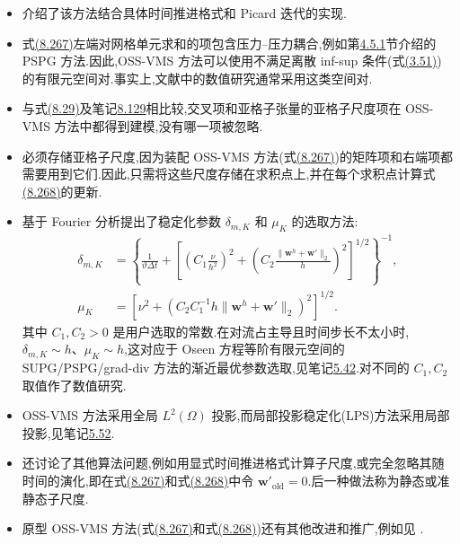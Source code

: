 \begin{note}
\label{note:vms-oss-properties}
\begin{itemize}
 \item \textcite{Codina2002}介绍了该方法结合具体时间推进格式和 Picard 迭代的实现.
 \item 式\hyperref[eq:vms-oss-resolved-scale-method]{(8.267)}左端对网格单元求和的项包含压力--压力耦合,例如第\hyperref[sec:stokes-pspg]{4.5.1}节介绍的 PSPG 方法.因此,OSS-VMS 方法可以使用不满足离散 inf-sup 条件(式\hyperref[eq:discrete-infsup-condition]{(3.51)})的有限元空间对.事实上,文献中的数值研究通常采用这类空间对.
 \item 与式\hyperref[eq:subgrid-stress-decomposition]{(8.29)}及笔记\hyperref[note:les-model-basic-approach]{8.129}相比较,交叉项和亚格子张量的亚格子尺度项在 OSS-VMS 方法中都得到建模,没有哪一项被忽略.
 \item 必须存储亚格子尺度,因为装配 OSS-VMS 方法(式\hyperref[eq:vms-oss-resolved-scale-method]{(8.267)})的矩阵项和右端项都需要用到它们.因此,只需将这些尺度存储在求积点上,并在每个求积点计算式\hyperref[eq:vms-oss-subscale-update]{(8.268)}的更新.
 \item \textcite{Codina2002}基于 Fourier 分析提出了稳定化参数 $\delta_{m,K}$ 和 $\mu_K$ 的选取方法:
 \[
 \begin{aligned}
 \delta_{m,K}&=\left\{\frac1{\vartheta\Delta t}
   +\left[\left(C_1\frac{\nu}{h^2}\right)^2
       +\left(C_2\frac{\|\bm w^h+\bm w'\|_2}{h}\right)^2\right]^{1/2}\right\}^{-1},\\
 \mu_K&=\left[\nu^2+
   \left(C_2 C_1^{-1}h\|\bm w^h+\bm w'\|_2\right)^2\right]^{1/2}.
 \end{aligned}
 \]
 其中 $C_1,C_2>0$ 是用户选取的常数.在对流占主导且时间步长不太小时,$\delta_{m,K}\sim h$、$\mu_K\sim h$,这对应于 Oseen 方程等阶有限元空间的 SUPG/PSPG/grad-div 方法的渐近最优参数选取,见笔记\hyperref[note:oseen-optimal-stabilization]{5.42}.\textcite{ColomesBadiaCodinaPrincipe2015}对不同的 $C_1,C_2$ 取值作了数值研究.
 \item OSS-VMS 方法采用全局 $L^2(\Omega)$ 投影,而局部投影稳定化(LPS)方法采用局部投影,见笔记\hyperref[note:oseen-lps-method]{5.52}.
 \item \textcite{Codina2002}还讨论了其他算法问题,例如用显式时间推进格式计算子尺度,或完全忽略其随时间的演化,即在式\hyperref[eq:vms-oss-resolved-scale-method]{(8.267)}和式\hyperref[eq:vms-oss-subscale-update]{(8.268)}中令 $\bm w'_{\mathrm{old}}=0$.后一种做法称为静态或准静态子尺度.
 \item 原型 OSS-VMS 方法(式\hyperref[eq:vms-oss-resolved-scale-method]{(8.267)}和式\hyperref[eq:vms-oss-subscale-update]{(8.268)})还有其他改进和推广,例如见 \textcite{ColomesBadiaCodinaPrincipe2015}.
\end{itemize}
\end{note}

